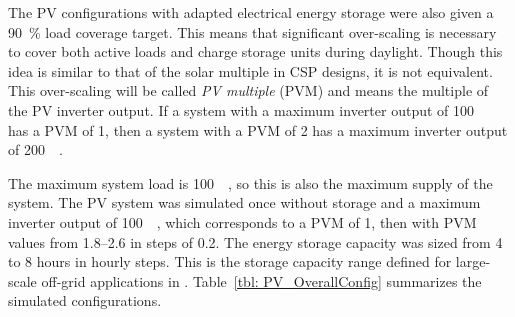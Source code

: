 The PV configurations with adapted electrical energy storage were also given a \SI{90}{\percent} load coverage target. This means that significant over-scaling is necessary to cover both active loads and charge storage units during daylight. Though this idea is similar to that of the solar multiple in CSP designs, it is not equivalent. This over-scaling will be called \emph{PV multiple} (PVM) and means the multiple of the PV inverter output. If a system with a maximum inverter output of \SI{100}{\mega\wattel} has a PVM of \num{1}, then a system with a PVM of \num{2} has a maximum inverter output of \SI{200}{\mega\wattel}. 


The maximum system load is \SI{100}{\mega\wattel}, so this is also the maximum supply of the system. The PV system was simulated once without storage and a maximum inverter output of \SI{100}{\mega\wattel}, which corresponds to a PVM of 1, then with PVM values from \numrange{1.8}{2.6} in steps of \num{0.2}. The energy storage capacity was sized from \num{4} to \num{8} hours in hourly steps. This is the storage capacity range  defined for large-scale off-grid applications in \cite{IEA2014c}. Table~\ref{tbl: PV_OverallConfig} summarizes the simulated configurations.


